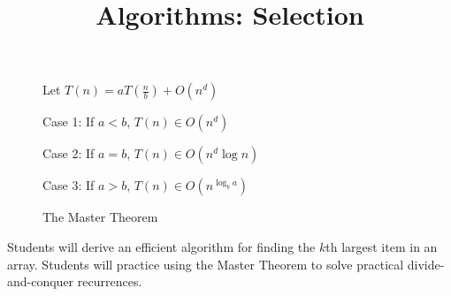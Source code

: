 \documentclass{tufte-handout}
\title{Algorithms: Selection}
\date{}
\begin{document}
\maketitle

\begin{figure}
\caption{The Master Theorem}
Let $T(n) = a T(\frac{n}{b}) + O(n^d)$ 

Case 1: If $a < b$, $T(n) \in O(n^d)$

Case 2: If $a = b$, $T(n) \in O(n^d \log n)$

Case 3: If $a > b$, $T(n) \in O(n^{\log_b a})$
\end{figure}

\begin{objective}
  Students will derive an efficient algorithm for finding the $k$th largest item in an array. Students will practice using the Master Theorem to solve practical divide-and-conquer recurrences.
\end{objective}
\end{document}
